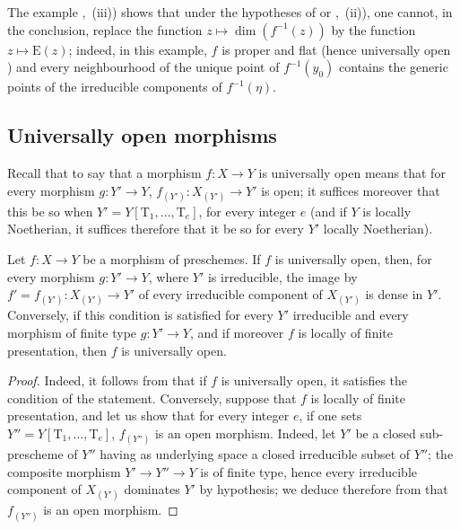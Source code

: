 \begin{remark}[14.2.7]
\label{IV.14.2.7}
The example ,~(iii)) shows that under the hypotheses of  or ,~(ii)), one cannot, in the conclusion, replace the function $z\mapsto\dim(f^{-1}(z))$ by the function $z\mapsto\mathrm{E}(z)$; indeed, in this example, $f$ is proper and flat (hence universally open ) and every neighbourhood of the unique point of $f^{-1}(y_0)$ contains the generic points of the irreducible components of $f^{-1}(\eta)$.
\end{remark}


\subsection{Universally open morphisms}
\label{subsection:IV.14.3}
\label{IV.14.3}

\begin{env}[14.3.1]
\label{IV.14.3.1}
Recall  that to say that a morphism $f:X\to Y$ is universally open means that for every morphism $g:Y'\to Y$, $f_{(Y')}:X_{(Y')}\to Y'$ is open; it suffices moreover that this be so when $Y'=Y[\mathrm{T}_1,\ldots,\mathrm{T}_e]$, for every integer $e$  (and if $Y$ is locally Noetherian, it suffices therefore that it be so for every $Y'$ locally Noetherian).
\end{env}

\begin{proposition}[14.3.2]
\label{IV.14.3.2}
Let $f:X\to Y$ be a morphism of preschemes.
If $f$ is universally open, then, for every morphism $g:Y'\to Y$, where $Y'$ is irreducible, the image by $f'=f_{(Y')}:X_{(Y')}\to Y'$ of every irreducible component of $X_{(Y')}$ is dense in $Y'$.
Conversely, if this condition is satisfied for every $Y'$ irreducible and every morphism of finite type $g:Y'\to Y$, and if moreover $f$ is locally of finite presentation, then $f$ is universally open.
\end{proposition}

\begin{proof}
Indeed, it follows from  that if $f$ is universally open, it satisfies the condition of the statement.
Conversely, suppose that $f$ is locally of finite presentation, and let us show that for every integer $e$, if one sets $Y''=Y[\mathrm{T}_1,\ldots,\mathrm{T}_e]$, $f_{(Y'')}$ is an open morphism.
Indeed, let $Y'$ be a closed sub-prescheme of $Y''$ having as underlying space a closed irreducible subset of $Y''$; the composite morphism $Y'\to Y''\to Y$ is of finite type, hence every irreducible component of $X_{(Y')}$ dominates $Y'$ by hypothesis; we deduce therefore from  that $f_{(Y'')}$ is an open morphism.
\end{proof}

